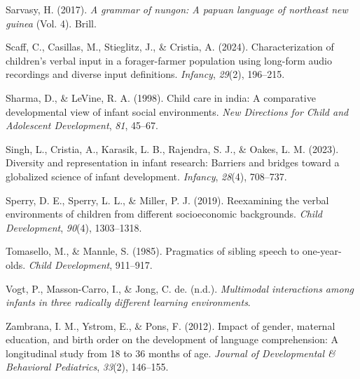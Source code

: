 \documentclass[
  man,floatsintext]{apa6}
\newlength{\cslhangindent}
\newlength{\cslentryspacingunit} %
\newenvironment{CSLReferences}[2] %
 {%
  \setlength{\parindent}{0pt}
  \ifodd #1
  \let\oldpar\par
  \def\par{\hangindent=\cslhangindent\oldpar}
  \fi
  \setlength{\parskip}{#2\cslentryspacingunit}
 }%
 {}
\begin{document}
\begin{CSLReferences}{1}{0}
\leavevmode{}%
Sarvasy, H. (2017). \emph{A grammar of nungon: A papuan language of northeast new guinea} (Vol. 4). Brill.

\leavevmode{}%
Scaff, C., Casillas, M., Stieglitz, J., \& Cristia, A. (2024). Characterization of children's verbal input in a forager-farmer population using long-form audio recordings and diverse input definitions. \emph{Infancy}, \emph{29}(2), 196--215.

\leavevmode{}%
Sharma, D., \& LeVine, R. A. (1998). Child care in india: A comparative developmental view of infant social environments. \emph{New Directions for Child and Adolescent Development}, \emph{81}, 45--67.

\leavevmode{}%
Singh, L., Cristia, A., Karasik, L. B., Rajendra, S. J., \& Oakes, L. M. (2023). Diversity and representation in infant research: Barriers and bridges toward a globalized science of infant development. \emph{Infancy}, \emph{28}(4), 708--737.

\leavevmode{}%
Sperry, D. E., Sperry, L. L., \& Miller, P. J. (2019). Reexamining the verbal environments of children from different socioeconomic backgrounds. \emph{Child Development}, \emph{90}(4), 1303--1318.

\leavevmode{}%
Tomasello, M., \& Mannle, S. (1985). Pragmatics of sibling speech to one-year-olds. \emph{Child Development}, 911--917.

\leavevmode{}%
Vogt, P., Masson-Carro, I., \& Jong, C. de. (n.d.). \emph{Multimodal interactions among infants in three radically different learning environments}.

\leavevmode{}%
Zambrana, I. M., Ystrom, E., \& Pons, F. (2012). Impact of gender, maternal education, and birth order on the development of language comprehension: A longitudinal study from 18 to 36 months of age. \emph{Journal of Developmental \& Behavioral Pediatrics}, \emph{33}(2), 146--155.

\end{CSLReferences}
\end{document}
